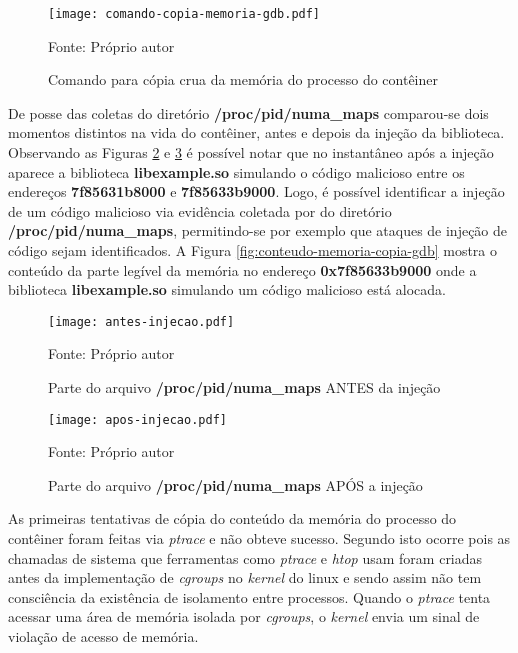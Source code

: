 \begin{figure}[htb!]
\footnotesize
\caption{Comando para cópia crua da memória do processo do contêiner}
\texttt{[image: comando-copia-memoria-gdb.pdf]}
\centering
\label{fig:comando-copia}
\begin{center}
Fonte: Próprio autor 
\end{center}
\end{figure}

%
De posse das coletas do diretório \textbf{/proc/pid/numa\_maps} comparou-se dois momentos distintos na vida do contêiner, antes e depois da injeção da biblioteca.
%
Observando as Figuras \ref{fig:antes-injecao} e \ref{fig:apos-injecao} é possível notar que no instantâneo após a injeção aparece a biblioteca \textbf{libexample.so} simulando o código malicioso entre os endereços \textbf{7f85631b8000} e \textbf{7f85633b9000}.
%
Logo, é possível identificar a injeção de um código malicioso via evidência coletada por \fancyname do diretório \textbf{/proc/pid/numa\_maps}, permitindo-se por exemplo que ataques de injeção de código sejam identificados.
%
A Figura \ref{fig:conteudo-memoria-copia-gdb} mostra o conteúdo da parte legível da memória no endereço \textbf{0x7f85633b9000} onde a biblioteca \textbf{libexample.so} simulando um código malicioso está alocada.

\begin{figure}[htb!]
\footnotesize
\caption{Parte do arquivo \textbf{/proc/pid/numa\_maps} ANTES da injeção }
\texttt{[image: antes-injecao.pdf]}
\centering
\label{fig:antes-injecao}
\begin{center}
Fonte: Próprio autor 
\end{center}
\end{figure}


\begin{figure}[htb!]
\footnotesize
\caption{Parte do arquivo \textbf{/proc/pid/numa\_maps} APÓS a injeção }
\texttt{[image: apos-injecao.pdf]}
\centering
\label{fig:apos-injecao}
\begin{center}
Fonte: Próprio autor 
\end{center}
\end{figure}

%
As primeiras tentativas de cópia do conteúdo da memória do processo do contêiner foram feitas via \textit{ptrace} e não obteve sucesso. 
%
Segundo \cite{cgroupsxptrace} isto ocorre pois as chamadas de sistema que ferramentas como \textit{ptrace} e \textit{htop} usam foram criadas antes da implementação de \textit{cgroups} no \textit{kernel} do linux e sendo assim não tem consciência da existência de isolamento entre processos.
%
Quando o \textit{ptrace} tenta acessar uma área de memória isolada por \textit{cgroups}, o \textit{kernel} envia um sinal de violação de acesso de memória.%
%

